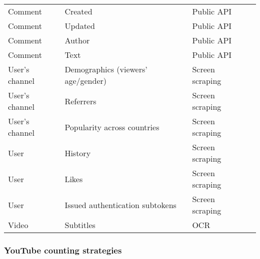 \documentclass{article}
\begin{document}
\begin{tabular}{l p{3cm} l p{4cm}}
Comment & Created & Public API \\
Comment & Updated & Public API \\
Comment & Author & Public API \\
Comment & Text & Public API \\

User's channel & Demographics (viewers' age/gender) & Screen scraping \\
User's channel & Referrers & Screen scraping \\
User's channel & Popularity across countries & Screen scraping \\
User & History & Screen scraping \\
User & Likes & Screen scraping \\
User & Issued authentication subtokens & Screen scraping \\

Video & Subtitles & OCR \\

\end{tabular}

\subsubsection{YouTube counting strategies}
\end{document}
